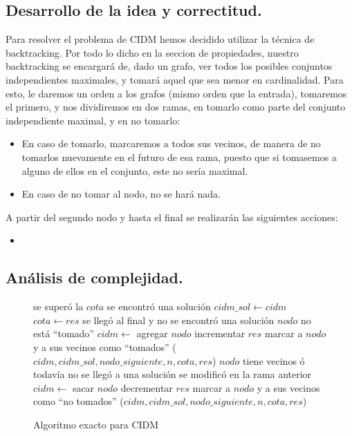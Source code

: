 \subsection{Desarrollo de la idea y correctitud.}

\vspace*{0.3cm}

Para resolver el problema de CIDM hemos decidido utilizar la técnica de backtracking. Por todo lo dicho en la seccion de propiedades, nuestro backtracking se encargará de, dado un grafo, ver todos los posibles conjuntos independientes maximales, y tomará aquel que sea menor en cardinalidad. Para esto, le daremos un orden a los grafos (mismo orden que la entrada), tomaremos el primero, y nos dividiremos en dos ramas, en tomarlo como parte del conjunto independiente maximal, y en no tomarlo:
\begin{itemize}
	\item  En caso de tomarlo, marcaremos a todos sus vecinos, de manera de no tomarlos nuevamente en el futuro de esa rama, puesto que si tomasemos a alguno de ellos en el conjunto, este no sería maximal.	
	\item En caso de no tomar al nodo, no se hará nada. 

\end{itemize}

A partir del segundo nodo y hasta el final se realizarán las siguientes acciones:
\begin{itemize}
	\item 
\end{itemize}
 
\vspace*{0.6cm}


\subsection{Análisis de complejidad.}

\vspace*{0.3cm}

\begin{figure}
\begin{codebox}
\li \If se superó la $cota$
\li \Then \Return
	\End
\li \If se encontró una solución
\li \Then 
 		$cidm\_sol \leftarrow cidm$
\li 		$cota \leftarrow res$
\li 		\Return
	\End
\li \If se llegó al final y no se encontró una solución
\li \Then \Return
	\End
\li \If $nodo$ no está ``tomado''	
\li \Then
		$cidm \leftarrow$ agregar $nodo$
\li 		incrementar $res$
\li 		marcar a $nodo$ y a sus vecinos como ``tomados''
($cidm,cidm\_sol,nodo\_siguiente,n,cota,res$)
	\End
\li \If $nodo$ tiene vecinos ó todavía no se llegó a una solución
\li \Then
 		\If se modificó en la rama anterior
\li 		\Then
			$cidm \leftarrow$ sacar $nodo$
\li			decrementar $res$
\li 			marcar a $nodo$ y a sus vecinos como ``no tomados''
		\End
{}($cidm,cidm\_sol,nodo\_siguiente,n,cota,res$)
\end{codebox}
\caption{Algoritmo exacto para CIDM}\label{code:exacto}
\end{figure}


